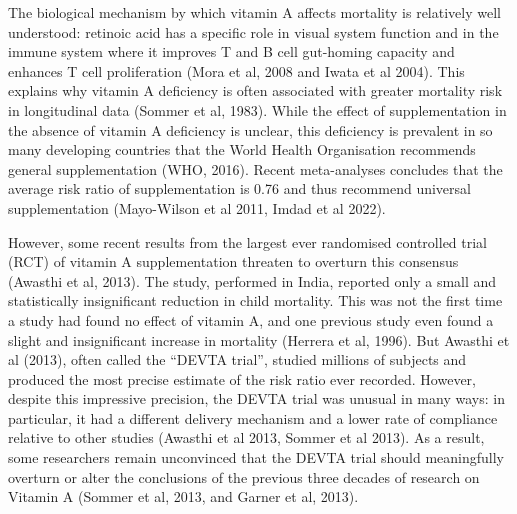 \documentclass[12pt]{article}
\begin{document}

The biological mechanism by which vitamin A affects mortality is relatively well understood: retinoic acid has a specific role in visual system function and in the immune system where it improves T and B cell gut-homing capacity and enhances T cell proliferation (Mora et al, 2008 and Iwata et al 2004). This explains why vitamin A deficiency is often associated with greater mortality risk in longitudinal data (Sommer et al, 1983). While the effect of supplementation in the absence of vitamin A deficiency is unclear, this deficiency is prevalent in so many developing countries that the World Health Organisation recommends general supplementation (WHO, 2016). 
Recent meta-analyses concludes that the average risk ratio of supplementation is 0.76 and thus recommend universal supplementation (Mayo-Wilson et al 2011, Imdad et al 2022). 

However, some recent results from the largest ever randomised controlled trial (RCT) of vitamin A supplementation threaten to overturn this consensus (Awasthi et al, 2013). The study, performed in India, reported only a small and statistically insignificant reduction in child mortality. This was not the first time a study had found no effect of vitamin A, and one previous study even found a slight and insignificant increase in mortality (Herrera et al, 1996). But Awasthi et al (2013), often called the ``DEVTA trial'', studied millions of subjects and produced the most precise estimate of the risk ratio ever recorded. However, despite this impressive precision, the DEVTA trial was unusual in many ways: in particular, it had a different delivery mechanism and a lower rate of compliance relative to other studies (Awasthi et al 2013, Sommer et al 2013). As a result, some researchers remain unconvinced that the DEVTA trial should meaningfully overturn or alter the conclusions of the previous three decades of research on Vitamin A (Sommer et al, 2013, and Garner et al, 2013).
\end{document}
